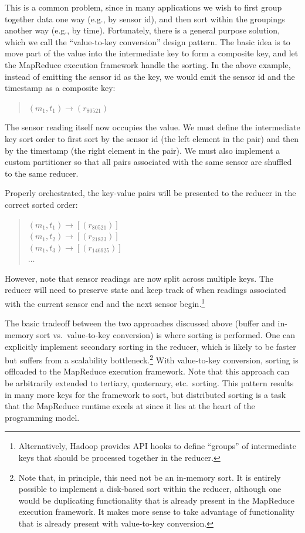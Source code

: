 This is a common problem, since in many applications we wish to first
group together data one way (e.g., by sensor id), and then sort within
the groupings another way (e.g., by time).  Fortunately, there is a
general purpose solution, which we call the ``value-to-key
conversion'' design pattern.  The basic idea is to move part of the
value into the intermediate key to form a composite key, and let the
MapReduce execution framework handle the sorting.  In the above
example, instead of emitting the sensor id as the key, we would emit
the sensor id and the timestamp as a composite key:

\begin{quote}
$(m_1, t_1) \rightarrow (r_{80521})$
\end{quote}

\noindent The sensor reading itself now occupies the value.  We must
define the intermediate key sort order to first sort by the sensor id
(the left element in the pair) and then by the timestamp (the right
element in the pair).  We must also implement a custom partitioner so
that all pairs associated with the same sensor are shuffled to the
same reducer.

Properly orchestrated, the key-value pairs will be presented to the
reducer in the correct sorted order:

\begin{quote}
$(m_1, t_1) \rightarrow [(r_{80521})]$ \\
$(m_1, t_2) \rightarrow [(r_{21823})]$ \\
$(m_1, t_3) \rightarrow [(r_{146925})]$ \\
$\ldots$
\end{quote}

\noindent However, note that sensor readings are now split across
multiple keys.  The reducer will need to preserve state and keep track
of when readings associated with the current sensor end and the next
sensor begin.\footnote{Alternatively, Hadoop provides API hooks to
  define ``groups'' of intermediate keys that should be processed
  together in the reducer.}

The basic tradeoff between the two approaches discussed above (buffer
and in-memory sort vs.\ value-to-key conversion) is where sorting is
performed.  One can explicitly implement secondary sorting in the
reducer, which is likely to be faster but suffers from a scalability
bottleneck.\footnote{Note that, in principle, this need not be an
  in-memory sort.  It is entirely possible to implement a disk-based
  sort within the reducer, although one would be duplicating
  functionality that is already present in the MapReduce execution
  framework.  It makes more sense to take advantage of functionality
  that is already present with value-to-key conversion.}  With
value-to-key conversion, sorting is offloaded to the MapReduce
execution framework.  Note that this approach can be arbitrarily
extended to tertiary, quaternary, etc.\ sorting.  This pattern results
in many more keys for the framework to sort, but distributed sorting
is a task that the MapReduce runtime excels at since it lies at the
heart of the programming model.

